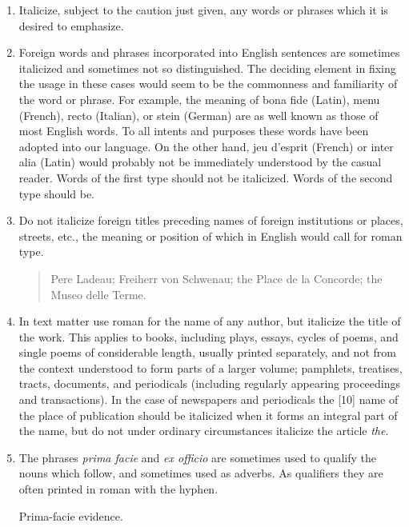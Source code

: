 \begin{enumerate}

\item  Italicize, subject to the caution just given, any words or phrases which it is desired to emphasize.
\item Foreign words and phrases incorporated into English sentences are sometimes italicized and sometimes not so distinguished. The deciding element in fixing the usage in these cases would seem to be the commonness and familiarity of the word or phrase. For example, the meaning of bona fide (Latin), menu (French), recto (Italian), or stein (German) are as well known as those of most English words. To all intents and purposes these words have been adopted into our language. On the other hand, jeu d'esprit (French) or inter alia (Latin) would probably not be immediately understood by the casual reader. Words of the first type should not be italicized. Words of the second type should be.

\item Do not italicize foreign titles preceding names of foreign institutions or places, streets, etc., the meaning or position of which in English would call for roman type.
        \begin{quote}
         \noindent Pere Ladeau; Freiherr von Schwenau; the Place de la Concorde; the Museo delle Terme.
       \end{quote}

\item In text matter use roman for the name of any author, but italicize the title of the work. This applies to books, including plays, essays, cycles of poems, and single poems of considerable length, usually printed separately, and not from the context understood to form parts of a larger volume; pamphlets, treatises, tracts, documents, and periodicals (including regularly appearing proceedings and transactions). In the case of newspapers and periodicals the [10] name of the place of publication should be italicized when it forms an integral part of the name, but do not under ordinary circumstances italicize the article \emph{the}.


\item The phrases \textit{prima facie} and \textit{ex officio} are sometimes used to qualify the nouns which follow, and sometimes used as adverbs. As qualifiers they are often printed in roman with the hyphen.

     \hspace*{1em} Prima-facie evidence.


\end{enumerate}

